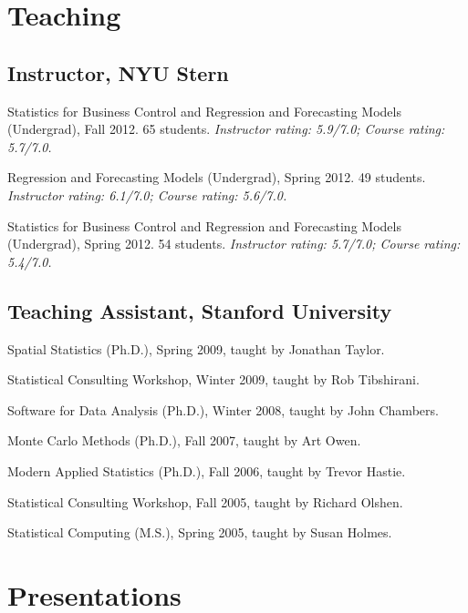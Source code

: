 \documentclass[10pt,letterpaper]{article}
\renewenvironment{itemize}{
  \begin{list}{}{
    \setlength{\leftmargin}{1.5em}
    \setlength{\itemsep}{0.25em}
    \setlength{\parskip}{0pt}
    \setlength{\parsep}{0.25em}
  }
}{
  \end{list}
}
\begin{document}
\section*{Teaching}

\subsection*{Instructor, NYU Stern}

\begin{itemize}

\item Statistics for Business Control and Regression and Forecasting Models
(Undergrad), Fall 2012.  65 students.
\textit{Instructor rating: 5.9/7.0; Course rating: 5.7/7.0.}

\item Regression and Forecasting Models (Undergrad), Spring 2012.  49
students.
\textit{Instructor rating: 6.1/7.0; Course rating: 5.6/7.0.}

\item Statistics for Business Control and Regression and Forecasting Models
(Undergrad), Spring 2012.  54 students.
\textit{Instructor rating: 5.7/7.0; Course rating: 5.4/7.0.}

\end{itemize}


\subsection*{Teaching Assistant, Stanford University}

\begin{itemize}
\item Spatial Statistics (Ph.D.), Spring 2009, taught by Jonathan Taylor.
\item Statistical Consulting Workshop, Winter 2009, taught by Rob Tibshirani.
\item Software for Data Analysis (Ph.D.), Winter 2008, taught by John Chambers.
\item Monte Carlo Methods (Ph.D.), Fall 2007, taught by Art Owen.
\item Modern Applied Statistics (Ph.D.), Fall 2006, taught by Trevor Hastie.
\item Statistical Consulting Workshop, Fall 2005, taught by Richard Olshen.
\item Statistical Computing (M.S.), Spring 2005, taught by Susan Holmes.
\end{itemize}

\section*{Presentations}
\end{document}
